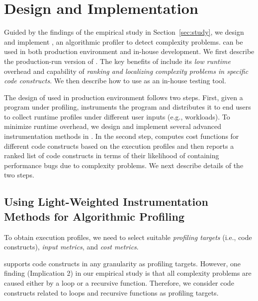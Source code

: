 \section{\Tool Design and Implementation}
\label{sec:online}


Guided by the findings of the empirical study in Section~\ref{sec:study},
we design and implement \Tool, an algorithmic
profiler to detect complexity problems. \Tool
can be used in both production environment 
and in-house development. We first describe
the production-run version of \Tool. 
The key benefits of \Tool include its \emph{low runtime} 
overhead and capability of \emph{ranking 
and localizing complexity problems in specific code constructs}. 
We then describe how to use \Tool as an in-house testing tool. 

The design of \Tool used in production environment 
follows two steps. First, given a program under profiling,
\Tool instruments the program and
distributes it to end users to collect runtime profiles
under different user inputs (e.g., workloads). 
To minimize runtime overhead, we design and implement
several advanced instrumentation methods in \Tool. 
In the second step, \Tool computes cost functions for
different code constructs based on the execution profiles
and then reports a ranked list of code constructs in
terms of their likelihood of containing performance bugs due to
complexity problems.  
We next describe details of the two steps. 


\subsection{Using Light-Weighted Instrumentation Methods
for Algorithmic Profiling}
\label{sec:opt}

To obtain execution profiles, we need to select suitable 
\emph{profiling targets} (i.e.,
code constructs), \emph{input metrics}, and \emph{cost metrics}. 

\Tool supports code constructs in any granularity as profiling targets. 
However, one finding (Implication 2) in our empirical study is 
that all complexity problems are 
caused either by a loop or a recursive function. 
Therefore, we consider code constructs related 
to loops and recursive functions as profiling targets. 

